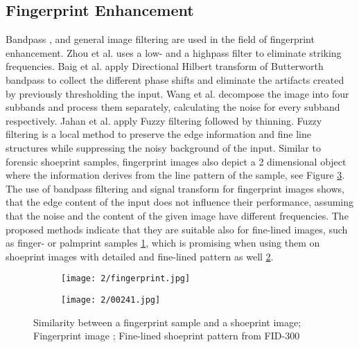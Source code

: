 \documentclass[draft,final]{vutinfth} %
\begin{document}
\subsection{Fingerprint Enhancement}
\par
Bandpass \cite{zhou2011adaptive}, \cite{baig2015enhancement} and general image filtering  \cite{jahan2017robust} are used in the field of fingerprint enhancement.
Zhou et al. \cite{zhou2011adaptive} uses a low- and a highpass filter to eliminate striking frequencies. 
Baig et al. \cite{baig2015enhancement} apply Directional Hilbert transform of Butterworth bandpass to collect the different phase shifts and eliminate the artifacts created by previously thresholding the input.
Wang et al. \cite{wang2014enhanced} decompose the image into four subbands and process them separately, calculating the noise for every subband respectively.
Jahan et al. \cite{jahan2017robust} apply Fuzzy filtering followed by thinning.
Fuzzy filtering is a local method to preserve the edge information and fine line structures while suppressing the noisy background of the input.
Similar to forensic shoeprint samples, fingerprint images also depict a 2 dimensional object where the information derives from the line pattern of the sample, see Figure \ref{fig:rw:fingerprint}.
The use of bandpass filtering and signal transform for fingerprint images shows, that the edge content of the input does not influence their performance, assuming that the noise and the content of the given image have different frequencies.
The proposed methods indicate that they are suitable also for fine-lined images, such as finger- or palmprint samples \ref{fig:rw:fp}, which is promising when using them on shoeprint images with detailed and fine-lined pattern as well \ref{fig:rw:ref}. 

\begin{figure}[h]
  \centering
  \begin{subfigure}[t]{0.4\columnwidth}
    \centering
    \texttt{[image: 2/fingerprint.jpg]}
    \subcaption{}
    \label{fig:rw:fp}
  \end{subfigure}
  \begin{subfigure}[t]{0.4\columnwidth}
    \centering
    \texttt{[image: 2/00241.jpg]}
    \subcaption{}
    \label{fig:rw:ref}
  \end{subfigure}
  \caption{Similarity between a fingerprint sample and a shoeprint  image;
		 Fingerprint image \cite{van2016fingerprint};  Fine-lined shoeprint pattern from FID-300  \cite{kortylewski2014unsupervised}}
  \label{fig:rw:fingerprint} %
\end{figure}
\end{document}
